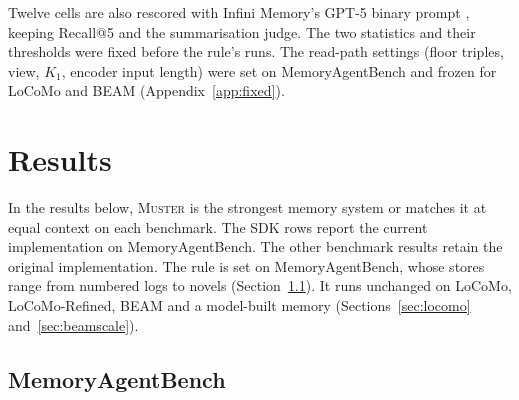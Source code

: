 \documentclass{article}
\newcommand{\sys}{\textsc{Muster}}
\begin{document}
Twelve cells are also rescored with Infini Memory's GPT-5 binary prompt \cite{infini}, keeping Recall@5 and the summarisation judge.
The two statistics and their thresholds were fixed before the rule's runs. The read-path settings (floor
triples, view, $K_1$, encoder input length) were set on MemoryAgentBench and frozen for LoCoMo and BEAM (Appendix~\ref{app:fixed}).

\section{Results}\label{sec:results}

In the results below, \sys{} is the strongest memory system or matches it at equal context on each benchmark. The SDK rows report the current implementation on MemoryAgentBench. The other benchmark results retain the original implementation. The rule is set on MemoryAgentBench, whose stores range from numbered logs to novels (Section~\ref{sec:mabres}). It runs unchanged on LoCoMo, LoCoMo-Refined, BEAM and a model-built memory (Sections~\ref{sec:locomo} and~\ref{sec:beamscale}).

\subsection{MemoryAgentBench}\label{sec:mabres}
\end{document}
